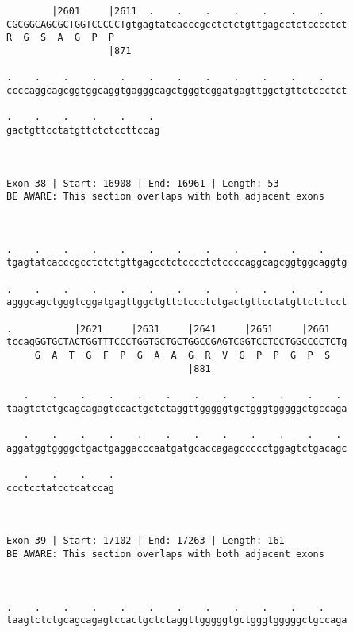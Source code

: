 \documentclass{article}
\begin{document}
\begin{Verbatim}
        |2601     |2611  .    .    .    .    .    .    .    
CGCGGCAGCGCTGGTCCCCCTgtgagtatcacccgcctctctgttgagcctctcccctct
R  G  S  A  G  P  P                                         
                  |871                                      
  
.    .    .    .    .    .    .    .    .    .    .    .    
ccccaggcagcggtggcaggtgagggcagctgggtcggatgagttggctgttctccctct
                                                            
.    .    .    .    .    . 
gactgttcctatgttctctccttccag
                           
                           
 
Exon 38 | Start: 16908 | End: 16961 | Length: 53
BE AWARE: This section overlaps with both adjacent exons



.    .    .    .    .    .    .    .    .    .    .    .    
tgagtatcacccgcctctctgttgagcctctcccctctccccaggcagcggtggcaggtg
                                                            
.    .    .    .    .    .    .    .    .    .    .    .    
agggcagctgggtcggatgagttggctgttctccctctgactgttcctatgttctctcct
                                                            
.           |2621     |2631     |2641     |2651     |2661   
tccagGGTGCTACTGGTTTCCCTGGTGCTGCTGGCCGAGTCGGTCCTCCTGGCCCCTCTg
     G  A  T  G  F  P  G  A  A  G  R  V  G  P  P  G  P  S   
                                |881                        
  
   .    .    .    .    .    .    .    .    .    .    .    . 
taagtctctgcagcagagtccactgctctaggttgggggtgctgggtgggggctgccaga
                                                            
   .    .    .    .    .    .    .    .    .    .    .    . 
aggatggtggggctgactgaggacccaatgatgcaccagagccccctggagtctgacagc
                                                            
   .    .    .    .
ccctcctatcctcatccag
                   
                   
 
Exon 39 | Start: 17102 | End: 17263 | Length: 161
BE AWARE: This section overlaps with both adjacent exons



.    .    .    .    .    .    .    .    .    .    .    .    
taagtctctgcagcagagtccactgctctaggttgggggtgctgggtgggggctgccaga
                                                            

\end{Verbatim}
\end{document}
